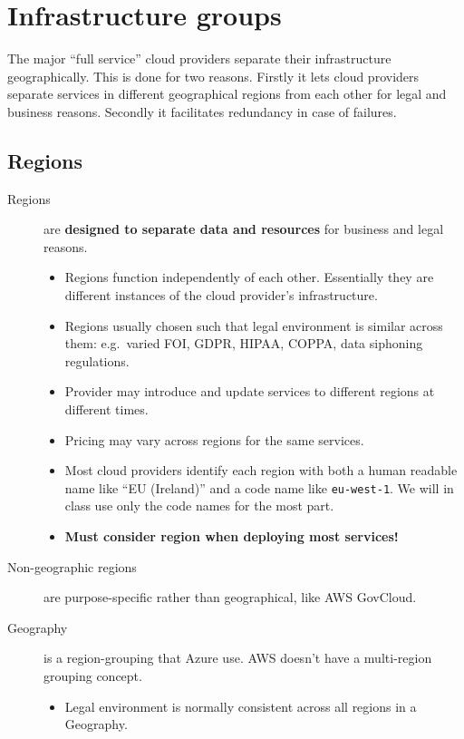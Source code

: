 \chapter{Infrastructure groups}
\label{ch:infrastructure-groups}


The major ``full service'' cloud providers separate their infrastructure
geographically. This is done for two reasons. Firstly it lets cloud
providers separate services in different geographical regions from each
other for legal and business reasons. Secondly it facilitates redundancy
in case of failures.

\section{Regions}
\label{sec:regions}

\begin{description}
\item[Regions] are \textbf{designed to separate data and resources} for business and legal reasons.

\begin{itemize}
\item
  Regions function independently of each other. Essentially they are
  different instances of the cloud provider's infrastructure.
\item
  Regions usually chosen such that legal environment is similar across
  them: e.g.~varied FOI, GDPR, HIPAA, COPPA, data siphoning regulations.
\item
  Provider may introduce and update services to different regions at
  different times.
\item
  Pricing may vary across regions for the same services.
\item
  Most cloud providers identify each region with both a human readable
  name like ``EU (Ireland)'' and a code name like \texttt{eu-west-1}. We
  will in class use only the code names for the most part.
\item
  \textbf{Must consider region when deploying most services!}
\end{itemize}
\item[Non-geographic regions]
are purpose-specific rather than geographical, like AWS GovCloud.
\item[Geography]
is a region-grouping that Azure use. AWS doesn't have a multi-region
grouping concept.

\begin{itemize}
\item
  Legal environment is normally consistent across all regions in a
  Geography.
\end{itemize}

\end{description}

